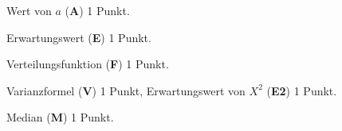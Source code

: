 \begin{bewertung}
\begin{teilaufgaben}
\item Wert von $a$ ({\bf A}) 1 Punkt.
\item Erwartungswert ({\bf E}) 1 Punkt.
\item Verteilungsfunktion ({\bf F}) 1 Punkt.
\item Varianzformel ({\bf V}) 1 Punkt,
Erwartungswert von $X^2$ ({\bf E2}) 1 Punkt.
\item Median ({\bf M}) 1 Punkt.
\end{teilaufgaben}
\end{bewertung}
